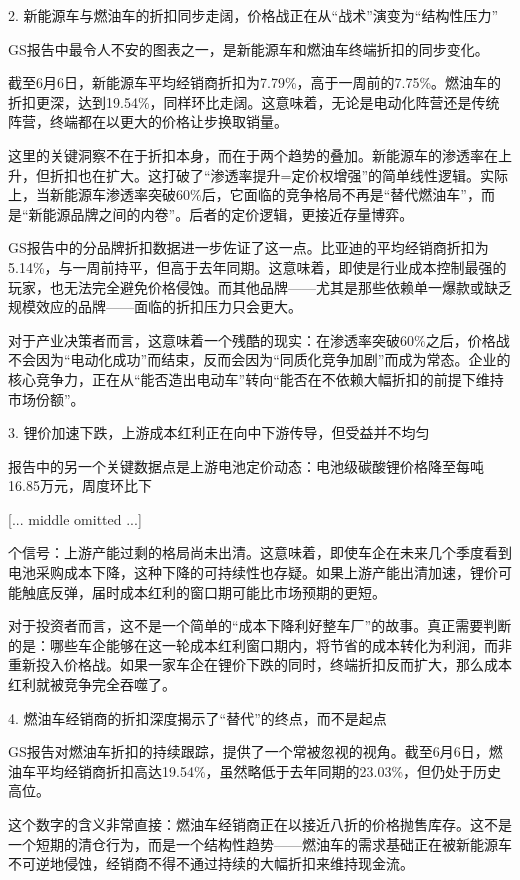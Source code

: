 \documentclass[11pt]{ctexart}
\begin{document}
2. 新能源车与燃油车的折扣同步走阔，价格战正在从“战术”演变为“结构性压力”

GS报告中最令人不安的图表之一，是新能源车和燃油车终端折扣的同步变化。

截至6月6日，新能源车平均经销商折扣为7.79\%，高于一周前的7.75\%。燃油车的折扣更深，达到19.54\%，同样环比走阔。这意味着，无论是电动化阵营还是传统阵营，终端都在以更大的价格让步换取销量。

这里的关键洞察不在于折扣本身，而在于两个趋势的叠加。新能源车的渗透率在上升，但折扣也在扩大。这打破了“渗透率提升=定价权增强”的简单线性逻辑。实际上，当新能源车渗透率突破60\%后，它面临的竞争格局不再是“替代燃油车”，而是“新能源品牌之间的内卷”。后者的定价逻辑，更接近存量博弈。

GS报告中的分品牌折扣数据进一步佐证了这一点。比亚迪的平均经销商折扣为5.14\%，与一周前持平，但高于去年同期。这意味着，即使是行业成本控制最强的玩家，也无法完全避免价格侵蚀。而其他品牌——尤其是那些依赖单一爆款或缺乏规模效应的品牌——面临的折扣压力只会更大。

对于产业决策者而言，这意味着一个残酷的现实：在渗透率突破60\%之后，价格战不会因为“电动化成功”而结束，反而会因为“同质化竞争加剧”而成为常态。企业的核心竞争力，正在从“能否造出电动车”转向“能否在不依赖大幅折扣的前提下维持市场份额”。

3. 锂价加速下跌，上游成本红利正在向中下游传导，但受益并不均匀

报告中的另一个关键数据点是上游电池定价动态：电池级碳酸锂价格降至每吨16.85万元，周度环比下

[... middle omitted ...]

个信号：上游产能过剩的格局尚未出清。这意味着，即使车企在未来几个季度看到电池采购成本下降，这种下降的可持续性也存疑。如果上游产能出清加速，锂价可能触底反弹，届时成本红利的窗口期可能比市场预期的更短。

对于投资者而言，这不是一个简单的“成本下降利好整车厂”的故事。真正需要判断的是：哪些车企能够在这一轮成本红利窗口期内，将节省的成本转化为利润，而非重新投入价格战。如果一家车企在锂价下跌的同时，终端折扣反而扩大，那么成本红利就被竞争完全吞噬了。

4. 燃油车经销商的折扣深度揭示了“替代”的终点，而不是起点

GS报告对燃油车折扣的持续跟踪，提供了一个常被忽视的视角。截至6月6日，燃油车平均经销商折扣高达19.54\%，虽然略低于去年同期的23.03\%，但仍处于历史高位。

这个数字的含义非常直接：燃油车经销商正在以接近八折的价格抛售库存。这不是一个短期的清仓行为，而是一个结构性趋势——燃油车的需求基础正在被新能源车不可逆地侵蚀，经销商不得不通过持续的大幅折扣来维持现金流。
\end{document}

